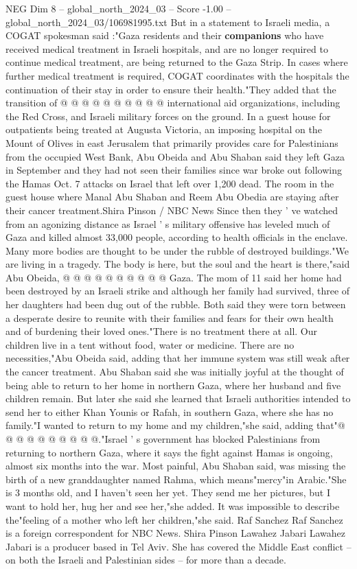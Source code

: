 \begin{textsample}{NEG Dim 8 – global\_north\_2024\_03 – Score -1.00 – global\_north\_2024\_03/106981995.txt}
But in a statement to Israeli media, a COGAT spokesman said :"Gaza residents and their \textbf{companions} who have received medical treatment in Israeli hospitals, and are no longer required to continue medical treatment, are being returned to the Gaza Strip.
In cases where further medical treatment is required, COGAT coordinates with the hospitals the continuation of their stay in order to ensure their health."They added that the transition of @ @ @ @ @ @ @ @ @ @ international aid organizations, including the Red Cross, and Israeli military forces on the ground.
In a guest house for outpatients being treated at Augusta Victoria, an imposing hospital on the Mount of Olives in east Jerusalem that primarily provides care for Palestinians from the occupied West Bank, Abu Obeida and Abu Shaban said they left Gaza in September and they had not seen their families since war broke out following the Hamas Oct. 7 attacks on Israel that left over 1,200 dead.
The room in the guest house where Manal Abu Shaban and Reem Abu Obedia are staying after their cancer treatment.Shira Pinson / NBC News Since then they ' ve watched from an agonizing distance as Israel ' s military offensive has leveled much of Gaza and killed almost 33,000 people, according to health officials in the enclave.
Many more bodies are thought to be under the rubble of destroyed buildings."We are living in a tragedy.
The body is here, but the soul and the heart is there,"said Abu Obeida, @ @ @ @ @ @ @ @ @ @ Gaza.
The mom of 11 said her home had been destroyed by an Israeli strike and although her family had survived, three of her daughters had been dug out of the rubble.
Both said they were torn between a desperate desire to reunite with their families and fears for their own health and of burdening their loved ones."There is no treatment there at all.
Our children live in a tent without food, water or medicine.
There are no necessities,"Abu Obeida said, adding that her immune system was still weak after the cancer treatment.
Abu Shaban said she was initially joyful at the thought of being able to return to her home in northern Gaza, where her husband and five children remain.
But later she said she learned that Israeli authorities intended to send her to either Khan Younis or Rafah, in southern Gaza, where she has no family."I wanted to return to my home and my children,"she said, adding that"@ @ @ @ @ @ @ @ @ @."Israel ' s government has blocked Palestinians from returning to northern Gaza, where it says the fight against Hamas is ongoing, almost six months into the war.
Most painful, Abu Shaban said, was missing the birth of a new granddaughter named Rahma, which means"mercy"in Arabic."She is 3 months old, and I haven't seen her yet.
They send me her pictures, but I want to hold her, hug her and see her,"she added.
It was impossible to describe the"feeling of a mother who left her children,"she said.
Raf Sanchez Raf Sanchez is a foreign correspondent for NBC News.
Shira Pinson Lawahez Jabari Lawahez Jabari is a producer based in Tel Aviv.
She has covered the Middle East conflict -- on both the Israeli and Palestinian sides -- for more than a decade.

\end{textsample}
